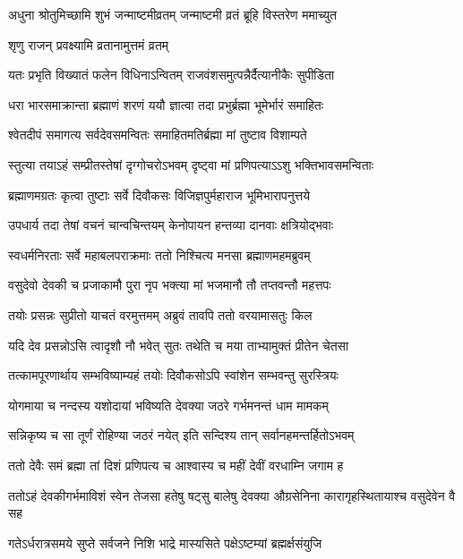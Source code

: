 \twolineshloka
{अधुना श्रोतुमिच्छामि शुभं जन्माष्टमीव्रतम्}
{जन्माष्टमी व्रतं ब्रूहि विस्तरेण ममाच्युत}%

\onelineshloka
{शृणु राजन् प्रवक्ष्यामि व्रतानामुत्तमं व्रतम्}%

\twolineshloka
{यतः प्रभृति विख्यातं फलेन विधिनाऽन्वितम्}
{राजवंशसमुत्पन्नैर्दैत्यानीकैः सुपीडिता}%

\twolineshloka
{धरा भारसमाक्रान्ता ब्रह्माणं शरणं ययौ}
{ज्ञात्वा तदा प्रभुर्ब्रह्मा भूमेर्भारं समाहितः}%

\twolineshloka
{श्वेतदीपं समागत्य सर्वदेवसमन्वितः}
{समाहितमतिर्ब्रह्मा मां तुष्टाव विशाम्पते}%

\twolineshloka
{स्तुत्या तयाऽहं सम्प्रीतस्तेषां दृग्गोचरोऽभवम्}
{दृष्ट्वा मां प्रणिपत्याऽऽशु भक्तिभावसमन्विताः}%

\twolineshloka
{ब्रह्माणमग्रतः कृत्वा तुष्टाः सर्वे दिवौकसः}
{विजिज्ञपुर्महाराज भूमिभारापनुत्तये}%

\twolineshloka
{उपधार्य तदा तेषां वचनं चान्वचिन्तयम्}
{केनोपायन हन्तव्या दानवाः क्षत्रियोद्भवाः}%

\twolineshloka
{स्वधर्मनिरताः सर्वे महाबलपराक्रमाः}
{ततो निश्चित्य मनसा ब्रह्माणमहमब्रुवम्}%

\twolineshloka
{वसुदेवो देवकी च प्रजाकामौ पुरा नृप}
{भक्त्या मां भजमानौ तौ तप्तवन्तौ महत्तपः}%

\twolineshloka
{तयोः प्रसन्नः सुप्रीतो याचतं वरमुत्तमम्}
{अब्रुवं तावपि ततो वरयामासतुः किल}%

\twolineshloka
{यदि देव प्रसन्नोऽसि त्वादृशौ नौ भवेत् सुतः}
{तथेति च मया ताभ्यामुक्तं प्रीतेन चेतसा}%

\twolineshloka
{तत्कामपूरणार्थाय सम्भविष्याम्यहं तयोः}
{दिवौकसोऽपि स्वांशेन सम्भवन्तु सुरस्त्रियः}%

\twolineshloka
{योगमाया च नन्दस्य यशोदायां भविष्यति}
{देवक्या जठरे गर्भमनन्तं धाम मामकम्}%

\twolineshloka
{सन्निकृष्य च सा तूर्णं रोहिण्या जठरं नयेत्}
{इति सन्दिश्य तान् सर्वानहमन्तर्हितोऽभवम्}%

\twolineshloka
{ततो देवैः समं ब्रह्मा तां दिशं प्रणिपत्य च}
{आश्वास्य च महीं देवीं वरधाम्नि जगाम ह}%

\threelineshloka
{ततोऽहं देवकीगर्भमाविशं स्वेन तेजसा}
{हतेषु षट्सु बालेषु देवक्या औग्रसेनिना}
{कारागृहस्थितायाश्च वसुदेवेन वै सह}%

\twolineshloka
{गतेऽर्धरात्रसमये सुप्ते सर्वजने निशि}
{भाद्रे मास्यसिते पक्षेऽष्टम्यां ब्रह्मर्क्षसंयुजि}%

